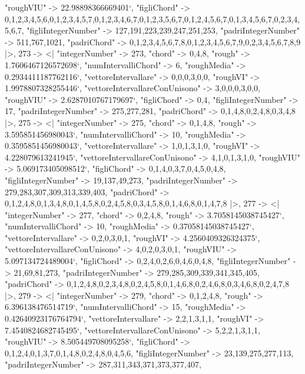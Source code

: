 \documentclass[
]{article}
\begin{document}
\begin{DatasetVerbatim}
    "roughVIU" -> 22.98898366669401`,
    "figliChord" -> {{0,1,2,3,4,5,6},{0,1,2,3,4,5,7},{0,1,2,3,4,6,7},{0,1,2,3,5,6,7},{0,1,2,4,5,6,7},{0,1,3,4,5,6,7},{0,2,3,4,5,6,7}},
    "figliIntegerNumber" -> {127,191,223,239,247,251,253},
    "padriIntegerNumber" -> {511,767,1021},
    "padriChord" -> {{0,1,2,3,4,5,6,7,8},{0,1,2,3,4,5,6,7,9},{0,2,3,4,5,6,7,8,9}}
  |>,
  273 -> <|
    "integerNumber" -> 273,
    "chord" -> {0,4,8},
    "rough" -> 1.7606467126572698`,
    "numIntervalliChord" -> 6,
    "roughMedia" -> 0.2934411187762116`,
    "vettoreIntervallare" -> {0,0,0,3,0,0},
    "roughVI" -> 1.9978807328255446`,
    "vettoreIntervallareConUnisono" -> {3,0,0,0,3,0,0},
    "roughVIU" -> 2.6287010767179697`,
    "figliChord" -> {{0,4}},
    "figliIntegerNumber" -> {17},
    "padriIntegerNumber" -> {275,277,281},
    "padriChord" -> {{0,1,4,8},{0,2,4,8},{0,3,4,8}}
  |>,
  275 -> <|
    "integerNumber" -> 275,
    "chord" -> {0,1,4,8},
    "rough" -> 3.595851456980043`,
    "numIntervalliChord" -> 10,
    "roughMedia" -> 0.3595851456980043`,
    "vettoreIntervallare" -> {1,0,1,3,1,0},
    "roughVI" -> 4.228079613241945`,
    "vettoreIntervallareConUnisono" -> {4,1,0,1,3,1,0},
    "roughVIU" -> 5.069173405098512`,
    "figliChord" -> {{0,1,4},{0,3,7},{0,4,5},{0,4,8}},
    "figliIntegerNumber" -> {19,137,49,273},
    "padriIntegerNumber" -> {279,283,307,309,313,339,403},
    "padriChord" -> {{0,1,2,4,8},{0,1,3,4,8},{0,1,4,5,8},{0,2,4,5,8},{0,3,4,5,8},{0,1,4,6,8},{0,1,4,7,8}}
  |>,
  277 -> <|
    "integerNumber" -> 277,
    "chord" -> {0,2,4,8},
    "rough" -> 3.7058145038745427`,
    "numIntervalliChord" -> 10,
    "roughMedia" -> 0.37058145038745427`,
    "vettoreIntervallare" -> {0,2,0,3,0,1},
    "roughVI" -> 4.2560409326324375`,
    "vettoreIntervallareConUnisono" -> {4,0,2,0,3,0,1},
    "roughVIU" -> 5.097134724489004`,
    "figliChord" -> {{0,2,4},{0,2,6},{0,4,6},{0,4,8}},
    "figliIntegerNumber" -> {21,69,81,273},
    "padriIntegerNumber" -> {279,285,309,339,341,345,405},
    "padriChord" -> {{0,1,2,4,8},{0,2,3,4,8},{0,2,4,5,8},{0,1,4,6,8},{0,2,4,6,8},{0,3,4,6,8},{0,2,4,7,8}}
  |>,
  279 -> <|
    "integerNumber" -> 279,
    "chord" -> {0,1,2,4,8},
    "rough" -> 6.396138476514719`,
    "numIntervalliChord" -> 15,
    "roughMedia" -> 0.42640923176764794`,
    "vettoreIntervallare" -> {2,2,1,3,1,1},
    "roughVI" -> 7.4540824682745495`,
    "vettoreIntervallareConUnisono" -> {5,2,2,1,3,1,1},
    "roughVIU" -> 8.505449708095258`,
    "figliChord" -> {{0,1,2,4},{0,1,3,7},{0,1,4,8},{0,2,4,8},{0,4,5,6}},
    "figliIntegerNumber" -> {23,139,275,277,113},
    "padriIntegerNumber" -> {287,311,343,371,373,377,407},

\end{DatasetVerbatim}
\end{document}
